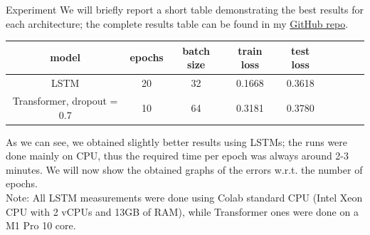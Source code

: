 \documentclass[aspectratio=169,t,xcolor=table]{beamer}
\begin{document}
\begin{frame}[allowframebreaks]{Experiment}
We will briefly report a short table demonstrating the best results for each architecture; the complete results table can be found in my \href{https://github.com/lorenzozanolin/StateEstimation}{GitHub repo}.%
\begin{table}[]
    \begin{tabular}{|c|c|c|c|c|c|c|c|c|}
    \hline
    \textbf{model} & \textbf{epochs} & \textbf{batch size} & \textbf{train loss} & \textbf{test loss} \\ \hline
    LSTM                                  & 20                                     & 32                                         & 0.1668              & 0.3618             \\ \hline
    Transformer, dropout = 0.7            & 10                                     & 64                                         & 0.3181               & 0.3780             \\ \hline
    \end{tabular}
    \end{table}
As we can see, we obtained slightly better results using LSTMs; the runs were done mainly on CPU, thus the required time per epoch was always around 2-3 minutes. We will now show the obtained graphs of the errors w.r.t. the number of epochs.\\
\vspace{2mm}
Note: All LSTM measurements were done using Colab standard CPU (Intel Xeon CPU with 2 vCPUs and 13GB of RAM), while Transformer ones were done on a M1 Pro 10 core.\\


\end{frame}
\end{document}
